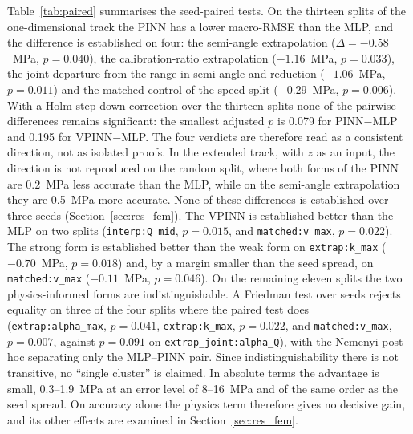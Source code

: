 \documentclass[pdflatex,sn-basic,Numbered]{sn-jnl}
\begin{document}
Table~\ref{tab:paired} summarises the seed-paired tests. On the thirteen splits of the one-dimensional track the PINN has a lower macro-RMSE than the MLP, and the difference is established on four: the semi-angle extrapolation ($\Delta=-0.58$~MPa, $p=0.040$), the calibration-ratio extrapolation ($-1.16$~MPa, $p=0.033$), the joint departure from the range in semi-angle and reduction ($-1.06$~MPa, $p=0.011$) and the matched control of the speed split ($-0.29$~MPa, $p=0.006$). With a Holm step-down correction \citep{holm1979,demsar2006} over the thirteen splits none of the pairwise differences remains significant: the smallest adjusted $p$ is 0.079 for PINN$-$MLP and 0.195 for VPINN$-$MLP. The four verdicts are therefore read as a consistent direction, not as isolated proofs. In the extended track, with $z$ as an input, the direction is not reproduced on the random split, where both forms of the PINN are 0.2~MPa less accurate than the MLP, while on the semi-angle extrapolation they are 0.5~MPa more accurate. None of these differences is established over three seeds (Section~\ref{sec:res_fem}).
The VPINN is established better than the MLP on two splits (\texttt{interp:Q\_mid}, $p=0.015$, and \texttt{matched:v\_max}, $p=0.022$). The strong form is established better than the weak form on \texttt{extrap:k\_max} ($-0.70$~MPa, $p=0.018$) and, by a margin smaller than the seed spread, on \texttt{matched:v\_max} ($-0.11$~MPa, $p=0.046$). On the remaining eleven splits the two physics-informed forms are indistinguishable. A Friedman test over seeds \citep{friedman1937,demsar2006} rejects equality on three of the four splits where the paired test does (\texttt{extrap:alpha\_max}, $p=0.041$, \texttt{extrap:k\_max}, $p=0.022$, and \texttt{matched:v\_max}, $p=0.007$, against $p=0.091$ on \texttt{extrap\_joint:alpha\_Q}), with the Nemenyi post-hoc separating only the MLP--PINN pair. Since indistinguishability there is not transitive, no ``single cluster'' is claimed. In absolute terms the advantage is small, 0.3--1.9~MPa at an error level of 8--16~MPa and of the same order as the seed spread. On accuracy alone the physics term therefore gives no decisive gain, and its other effects are examined in Section~\ref{sec:res_fem}.
\end{document}
